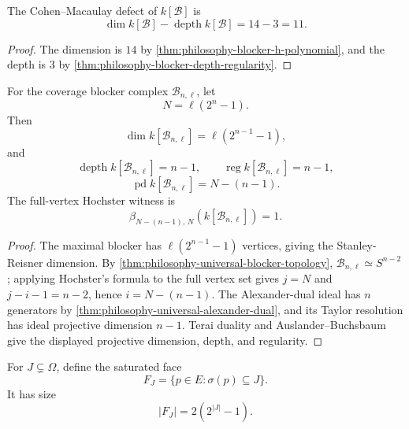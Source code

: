 \begin{corollary}
\label{cor:philosophy-blocker-cohen-macaulay-defect}
The Cohen--Macaulay defect of $k[\mathcal{B}]$ is
$$
  \dim k[\mathcal{B}]-\operatorname{depth}k[\mathcal{B}]
  =
  14-3
  =
  11.
$$
\end{corollary}
\begin{proof}
The dimension is $14$ by
\autoref{thm:philosophy-blocker-h-polynomial}, and the depth is $3$ by
\autoref{thm:philosophy-blocker-depth-regularity}.
\end{proof}

\begin{theorem}
\label{thm:philosophy-universal-coverage-blocker-homological-invariants}
For the coverage blocker complex $\mathcal{B}_{n,\ell}$, let
$$
  N=\ell(2^{n}-1).
$$
Then
$$
  \dim k[\mathcal{B}_{n,\ell}]
  =
  \ell(2^{n-1}-1),
$$
and
$$
  \operatorname{depth}k[\mathcal{B}_{n,\ell}]
  =
  n-1,
  \qquad
  \operatorname{reg}k[\mathcal{B}_{n,\ell}]
  =
  n-1,
$$
$$
  \operatorname{pd}k[\mathcal{B}_{n,\ell}]
  =
  N-(n-1).
$$
The full-vertex Hochster witness is
$$
  \beta_{N-(n-1),\,N}(k[\mathcal{B}_{n,\ell}])=1.
$$
\end{theorem}
\begin{proof}
The maximal blocker has $\ell(2^{n-1}-1)$ vertices, giving the
Stanley-Reisner dimension. By
\autoref{thm:philosophy-universal-blocker-topology},
$\mathcal{B}_{n,\ell}\simeq S^{n-2}$; applying Hochster's formula to
the full vertex set gives $j=N$ and $j-i-1=n-2$, hence
$i=N-(n-1)$. The Alexander-dual ideal has $n$ generators by
\autoref{thm:philosophy-universal-alexander-dual}, and its Taylor
resolution has ideal projective dimension $n-1$. Terai duality and
Auslander--Buchsbaum give the displayed projective dimension, depth,
and regularity.
\end{proof}

\begin{definition}
\label{def:philosophy-saturated-blocker-faces}
For $J\subsetneq\Omega$, define the saturated face
$$
  F_{J}=\{p\in E:\sigma(p)\subseteq J\}.
$$
It has size
$$
  |F_{J}|=2(2^{|J|}-1).
$$
\end{definition}

